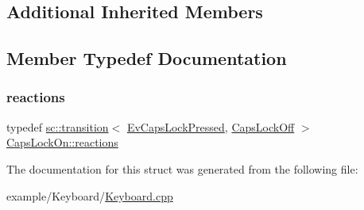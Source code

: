 \subsection*{Additional Inherited Members}


\subsection{Member Typedef Documentation}
\mbox{\label{struct_caps_lock_on_a86c554b888ebff198c4b8d4ba48b5728}} 
\subsubsection{\texorpdfstring{reactions}{reactions}}
{\footnotesize\ttfamily typedef \mbox{\hyperlink{classboost_1_1statechart_1_1transition}{sc\+::transition}}$<$ \mbox{\hyperlink{struct_ev_caps_lock_pressed}{Ev\+Caps\+Lock\+Pressed}}, \mbox{\hyperlink{struct_caps_lock_off}{Caps\+Lock\+Off}} $>$ \mbox{\hyperlink{struct_caps_lock_on_a86c554b888ebff198c4b8d4ba48b5728}{Caps\+Lock\+On\+::reactions}}}



The documentation for this struct was generated from the following file\+:\begin{DoxyCompactItemize}
\item 
example/\+Keyboard/\mbox{\hyperlink{_keyboard_8cpp}{Keyboard.\+cpp}}\end{DoxyCompactItemize}
